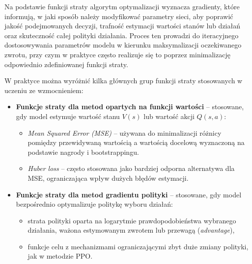 Na podstawie funkcji straty algorytm optymalizacji wyznacza gradienty, które informują, w jaki sposób należy modyfikować parametry sieci, aby poprawić jakość podejmowanych decyzji, trafność estymacji wartości stanów lub działań oraz skuteczność całej polityki działania. Proces ten prowadzi do iteracyjnego dostosowywania parametrów modelu w kierunku maksymalizacji oczekiwanego zwrotu, przy czym w praktyce często realizuje się to poprzez minimalizację odpowiednio zdefiniowanej funkcji straty.

W praktyce można wyróżnić kilka głównych grup funkcji straty stosowanych w uczeniu ze wzmocnieniem:
\begin{itemize}
	\item \textbf{Funkcje straty dla metod opartych na funkcji wartości} -- stosowane, gdy model estymuje wartość stanu $V(s)$ lub wartość akcji $Q(s,a)$:
	\begin{itemize}
		\item \textit{Mean Squared Error (MSE)} -- używana do minimalizacji różnicy pomiędzy przewidywaną wartością a wartością docelową wyznaczoną na podstawie nagrody i bootstrappingu.
		\item \textit{Huber loss} -- często stosowana jako bardziej odporna alternatywa dla MSE, ograniczająca wpływ dużych błędów estymacji.
	\end{itemize}
	
	\item \textbf{Funkcje straty dla metod gradientu polityki} -- stosowane, gdy model bezpośrednio optymalizuje politykę wyboru działań:
	\begin{itemize}
		\item strata polityki oparta na logarytmie prawdopodobieństwa wybranego działania, ważona estymowanym zwrotem lub przewagą (\textit{advantage}),
		\item funkcje celu z mechanizmami ograniczającymi zbyt duże zmiany polityki, jak w metodzie PPO.
	\end{itemize}
\end{itemize}

